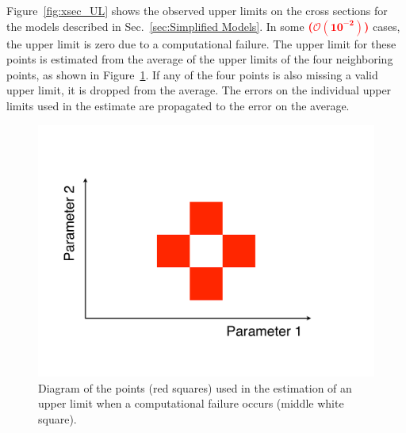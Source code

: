 \documentclass[dissertation.tex]{subfiles}
\begin{document}
Figure~\ref{fig:xsec_UL} shows the observed upper limits on the cross sections for the models described in Sec.~\ref{sec:Simplified Models}.  In some \textcolor{red}{\textbf{($\mathbf{\mathcal{O}(10^{-2})}$)}} cases, the upper limit is zero due to a computational failure.  The upper limit for these points is estimated from the average of the upper limits of the four neighboring points, as shown in Figure~\ref{fig:UL_estimation_points}.  If any of the four points is also missing a valid upper limit, it is dropped from the average.  The errors on the individual upper limits used in the estimate are propagated to the error on the average.


\begin{figure}
	\centering
	\includegraphics[scale=0.3]{UL_estimation_points}
	\caption{Diagram of the points (red squares) used in the estimation of an upper limit when a computational failure occurs (middle white square).}
	\label{fig:UL_estimation_points}
\end{figure}
\end{document}
